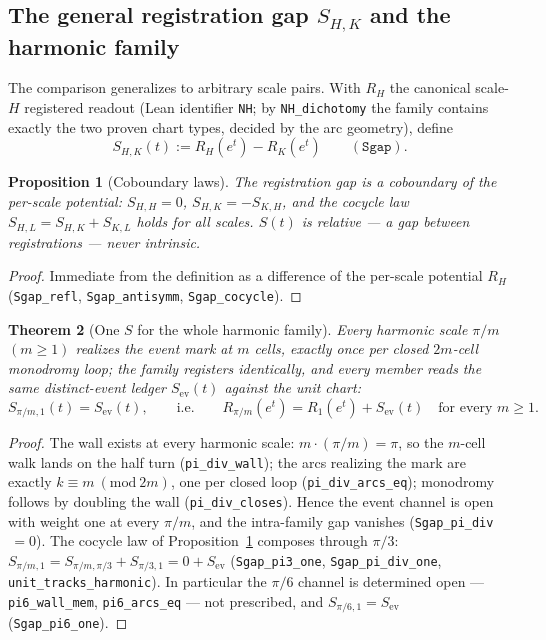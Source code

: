 \documentclass[11pt]{article}
\newtheorem{theorem}{Theorem}
\newtheorem{proposition}[theorem]{Proposition}
\theoremstyle{definition}
\begin{document}
\subsection{The general registration gap \texorpdfstring{\(S_{H,K}\)}{S(H,K)} and the harmonic family}
The comparison generalizes to arbitrary scale pairs.  With \(R_H\) the
canonical scale-\(H\) registered readout (Lean identifier \texttt{NH}; by
\texttt{NH\_dichotomy} the
family contains exactly the two proven chart types, decided by the arc
geometry), define
\[
S_{H,K}(t):=R_H(e^t)-R_K(e^t)
\qquad(\texttt{Sgap}).
\]
\begin{proposition}[Coboundary laws]\label{prop:sgap-coboundary}
The registration gap is a coboundary of the per-scale potential:
\(S_{H,H}=0\), \(S_{H,K}=-S_{K,H}\), and the cocycle law
\(S_{H,L}=S_{H,K}+S_{K,L}\) holds for all scales.  \(S(t)\) is relative ---
a gap between registrations --- never intrinsic.
\end{proposition}

\begin{proof}
Immediate from the definition as a difference of the per-scale potential
\(R_H\) (\texttt{Sgap\_refl}, \texttt{Sgap\_antisymm},
\texttt{Sgap\_cocycle}).
\end{proof}

\begin{theorem}[One \(S\) for the whole harmonic family]\label{thm:harmonic-family-S}
Every harmonic scale \(\pi/m\) \((m\ge1)\) realizes the event mark at \(m\)
cells, exactly once per closed \(2m\)-cell monodromy loop; the family
registers identically, and every member reads the same distinct-event
ledger \(S_{\mathrm{ev}}(t)\) against the unit chart:
\[
S_{\pi/m,1}(t)=S_{\mathrm{ev}}(t),\qquad\text{i.e.}\qquad
R_{\pi/m}(e^t)=R_1(e^t)+S_{\mathrm{ev}}(t)\quad\text{for every }m\ge1.
\]
\end{theorem}

\begin{proof}
The wall exists at every harmonic scale: \(m\cdot(\pi/m)=\pi\), so the
\(m\)-cell walk lands on the half turn (\texttt{pi\_div\_wall}); the arcs
realizing the mark are exactly \(k\equiv m\ (\mathrm{mod}\ 2m)\), one per
closed loop (\texttt{pi\_div\_arcs\_eq}); monodromy follows by doubling the
wall (\texttt{pi\_div\_closes}).  Hence the event channel is open with weight
one at every \(\pi/m\), and the intra-family gap vanishes
(\texttt{Sgap\_pi\_div}\(\,=0\)).  The cocycle law of
Proposition~\ref{prop:sgap-coboundary} composes through \(\pi/3\):
\(S_{\pi/m,1}=S_{\pi/m,\pi/3}+S_{\pi/3,1}=0+S_{\mathrm{ev}}\)
(\texttt{Sgap\_pi3\_one}, \texttt{Sgap\_pi\_div\_one},
\texttt{unit\_tracks\_harmonic}).  In particular the \(\pi/6\) channel is
determined open --- \texttt{pi6\_wall\_mem}, \texttt{pi6\_arcs\_eq} --- not
prescribed, and \(S_{\pi/6,1}=S_{\mathrm{ev}}\)
(\texttt{Sgap\_pi6\_one}).
\end{proof}
\end{document}
